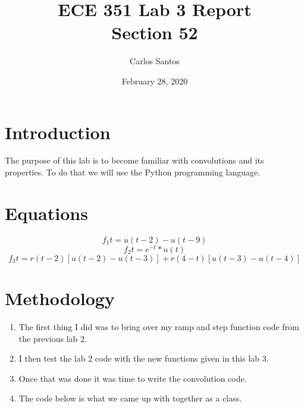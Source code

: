 \documentclass[12pt]{article}
\title{ECE 351 Lab 3 Report \\ Section 52}
\date{February 28, 2020}
\author{Carlos Santos}
\begin{document}
\vspace{\fill}
\maketitle
\vspace{\fill}
\clearpage

\section*{Introduction}

The purpose of this lab is to become familiar with convolutions and its properties. To do that we will use the Python programming language. 

\section*{Equations}

\begin{equation}
    f_1t = u(t-2) - u(t-9)
\end{equation}
\begin{equation}
    f_2t = e^{-t} * u(t)
\end{equation}
\begin{equation}
    f_3t = r(t-2)[u(t-2) - u(t-3)] + r(4-t)[u(t-3) - u(t-4)]
\end{equation}



\section*{Methodology}

\begin{enumerate}
    \item The first thing  I did was to bring over my ramp and step function code from the previous lab 2.
    \item I then test the lab 2 code with the new functions given in this lab 3.
    \item Once that was done it was time to write the convolution code.
    \item The code below is what we came up with together as a class.
\end{enumerate}
\end{document}
